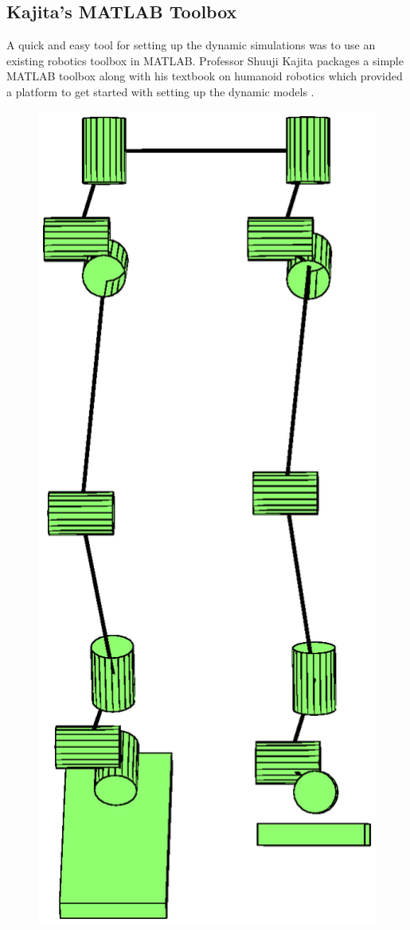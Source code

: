 
\subsection{Kajita's MATLAB Toolbox} %
\label{sec:kajita_s_matlab_toolbox}
A quick and easy tool for setting up the dynamic simulations was to use an existing robotics toolbox in MATLAB. Professor Shuuji Kajita packages a simple MATLAB \cite{sw:matlab} toolbox along with his textbook on humanoid robotics which provided a platform to get started with setting up the dynamic models \cite{kajitatxt}. 

\begin{figure}[!ht]
	\begin{center}
    \includegraphics[scale=0.6]{fig/design/ulinkdrawn.eps}

\end{center}
\end{figure}
